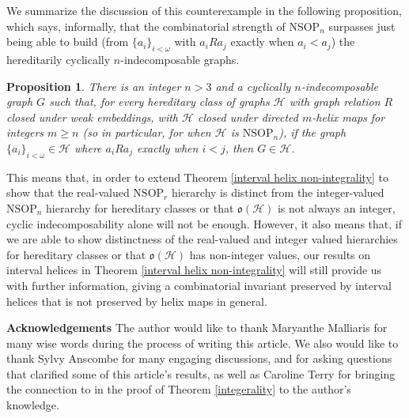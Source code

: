 \documentclass{amsart}
\newtheorem{prop}[theorem]{Proposition}
\theoremstyle{definition}
\theoremstyle{remark}
\numberwithin{equation}{section}
\begin{document}
We summarize the discussion of this counterexample in the following proposition, which says, informally, that the combinatorial strength of $\mathrm{NSOP}_{n}$ surpasses just being able to build (from $\{a_{i}\}_{i <\omega}$ with $a_{i} R a_{j}$ exactly when $a_{i} < a_{j}$) the hereditarily cyclically $n$-indecomposable graphs.

\begin{prop}
There is an integer $n > 3$ and a cyclically $n$-indecomposable graph $G$ such that, for every hereditary class of graphs $\mathcal{H}$ with graph relation $R$ closed under weak embeddings, with $\mathcal{H}$ closed under directed $m$-helix maps for integers $m \geq n$ (so in particular, for when $\mathcal{H}$ is $\mathrm{NSOP}_{n}$), if the graph $\{a_{i}\}_{i < \omega} \in \mathcal{H}$ where $a_{i} R a_{j}$ exactly when $i < j$, then $G \in \mathcal{H}$.
\end{prop}

This means that, in order to extend Theorem \ref{interval helix non-integrality} to show that the real-valued $\mathrm{NSOP}_{r}$ hierarchy is distinct from the integer-valued $\mathrm{NSOP}_{n}$ hierarchy for hereditary classes or that $\mathfrak{o}(\mathcal{H})$ is not always an integer, cyclic indecomposability alone will not be enough. However, it also means that, if we are able to show distinctness of the real-valued and integer valued hierarchies for hereditary classes or that $\mathfrak{o}(\mathcal{H})$ has non-integer values, our results on interval helices in Theorem \ref{interval helix non-integrality} will still provide us with further information, giving a combinatorial invariant preserved by interval helices that is not preserved by helix maps in general.







\textbf{Acknowledgements} The author would like to thank Maryanthe Malliaris for many wise words during the process of writing this article. We also would like to thank Sylvy Anscombe for many engaging discussions, and for asking questions that clarified some of this article's results, as well as Caroline Terry for bringing the connection to \cite{LZ17} in the proof of Theorem \ref{integerality} to the author's knowledge.



\end{document}
